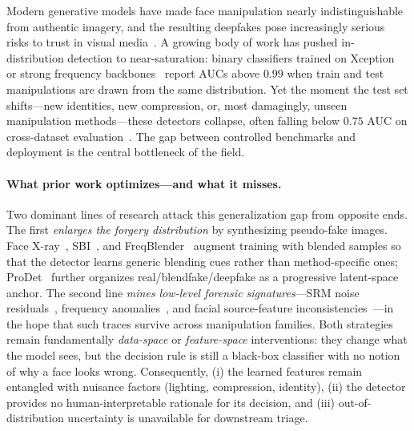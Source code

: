 \documentclass{article}
\begin{document}
Modern generative models have made face manipulation nearly indistinguishable from authentic imagery, and the resulting deepfakes pose increasingly serious risks to trust in visual media~\citep{rossler2019faceforensics,dolhansky2020dfdc}. A growing body of work has pushed in-distribution detection to near-saturation: binary classifiers trained on Xception~\citep{chollet2017xception} or strong frequency backbones~\citep{qian2020thinking,luo2021generalizing} report AUCs above $0.99$ when train and test manipulations are drawn from the same distribution. Yet the moment the test set shifts---new identities, new compression, or, most damagingly, unseen manipulation methods---these detectors collapse, often falling below $0.75$ AUC on cross-dataset evaluation~\citep{li2020celeb,shiohara2022detecting,cheng2024prodet}. The gap between controlled benchmarks and deployment is the central bottleneck of the field.

\paragraph{What prior work optimizes---and what it misses.}
Two dominant lines of research attack this generalization gap from opposite ends. The first \emph{enlarges the forgery distribution} by synthesizing pseudo-fake images. Face X-ray~\citep{li2020face}, SBI~\citep{shiohara2022detecting}, and FreqBlender~\citep{li2024freqblender} augment training with blended samples so that the detector learns generic blending cues rather than method-specific ones; ProDet~\citep{cheng2024prodet} further organizes real/blendfake/deepfake as a progressive latent-space anchor. The second line \emph{mines low-level forensic signatures}---SRM noise residuals~\citep{luo2021generalizing,fridrich2012rich}, frequency anomalies~\citep{qian2020thinking}, and facial source-feature inconsistencies~\citep{zhao2021multi}---in the hope that such traces survive across manipulation families. Both strategies remain fundamentally \emph{data-space} or \emph{feature-space} interventions: they change what the model sees, but the decision rule is still a black-box classifier with no notion of why a face looks wrong. Consequently, (i) the learned features remain entangled with nuisance factors (lighting, compression, identity), (ii) the detector provides no human-interpretable rationale for its decision, and (iii) out-of-distribution uncertainty is unavailable for downstream triage.
\end{document}
